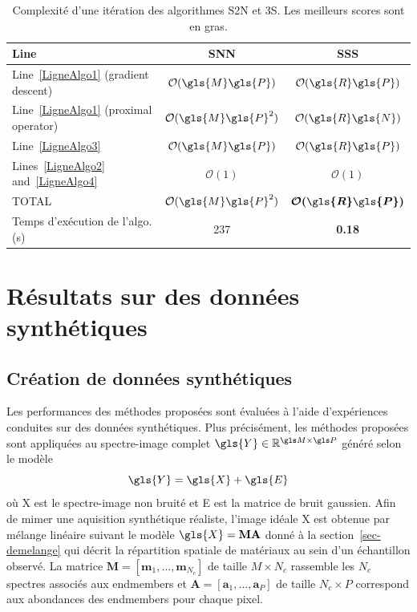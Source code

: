 \begin{table}[h!]
    \centering
    \bgroup
    \def\arraystretch{1.5}
    \begin{tabular}{b{5cm}cc}
        \toprule
        Line&SNN&SSS\\
        \midrule
        Line~\ref{LigneAlgo1} (gradient descent)        &$\mathcal{O}(\gls{M}\gls{P})$      &$\mathcal{O}(\gls{R} \gls{P})$\\
        Line~\ref{LigneAlgo1} (proximal operator)       &$\mathcal{O}(\gls{M}\gls{P}^2)$    &$\mathcal{O}(\gls{R} \gls{N})$\\
        Line~\ref{LigneAlgo3}                           &$\mathcal{O}(\gls{M}\gls{P})$      &$\mathcal{O}(\gls{R}\gls{P})$\\
        Lines~\ref{LigneAlgo2} and~\ref{LigneAlgo4}     &$\mathcal{O}(1)$           &$\mathcal{O}(1)$\\
        TOTAL&$\mathcal{O}(\gls{M}\gls{P}^2)$    &$\boldsymbol{\mathcal{O}(\gls{R} \gls{P})}$\\
        \bottomrule
        Temps d'exécution de l'algo. (s)&237&\textbf{0.18}\\
        \bottomrule
    \end{tabular}
    \egroup
    \caption{Complexité d'une itération des algorithmes S2N et 3S. Les meilleurs scores sont en gras.
        \protect\label{table-ComplexitySummary}}
\end{table} 

%
\section{Résultats sur des données synthétiques}

\subsection{Création de données synthétiques}\label{sec-synth-data-lr}

Les performances des méthodes proposées sont évaluées à l'aide d'expériences conduites sur des données synthétiques. Plus précisément, les méthodes proposées sont appliquées au spectre-image complet $\gls{Y}\in\mathbb{R}^{\taille{M}{P}}$ généré selon le modèle
\begin{equation}
    \gls{Y} = \gls{X} + \gls{E}
\end{equation}
où \gls{X} est le spectre-image non bruité et \gls{E} est la matrice de bruit gaussien.
Afin de mimer une aquisition synthétique réaliste, l'image idéale \gls{X} est obtenue par mélange linéaire suivant le modèle $\gls{X} = \mathbf{M}\mathbf{A}$ donné à la section~\ref{sec-demelange} qui décrit la répartition spatiale de matériaux au sein d'un échantillon observé. La matrice $\mathbf{M}=[\mathbf{m}_1, \dots, \mathbf{m}_{N_c}]$ de taille $M\times N_c$ rassemble les $N_c$ spectres associés aux endmembers et $\mathbf{A} = [\mathbf{a}_1, \dots, \mathbf{a}_P]$ de taille $N_c\times P$ correspond aux abondances des endmembers pour chaque pixel.

